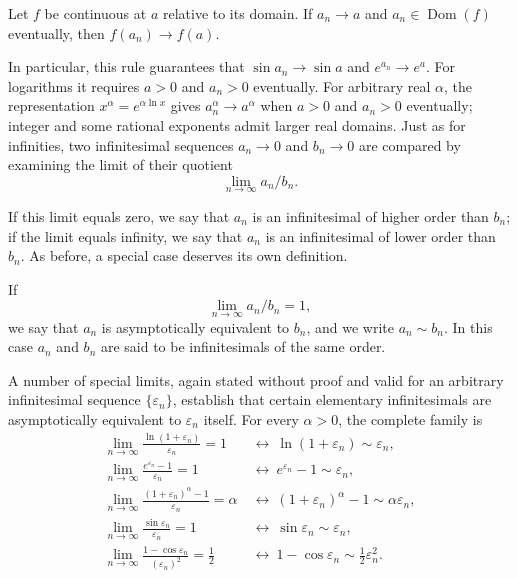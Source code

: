 \begin{theorem}
Let $f$ be continuous at $a$ relative to its domain. If $a_n\to a$ and
$a_n\in\operatorname{Dom}(f)$ eventually, then $f(a_n)\to f(a)$.
\end{theorem}

In particular, this rule guarantees that $\sin a_n \to \sin a$ and
$e^{a_n}\to e^a$. For logarithms it requires $a>0$ and $a_n>0$
eventually. For arbitrary real $\alpha$, the representation
$x^\alpha=e^{\alpha\ln x}$ gives $a_n^\alpha\to a^\alpha$ when $a>0$
and $a_n>0$ eventually; integer and some rational exponents admit larger
real domains. Just as for infinities, two
infinitesimal sequences $a_n \to 0$ and $b_n \to 0$ are compared by examining the limit of their quotient
\[
\lim_{n \to \infty} a_n / b_n.
\]

If this limit equals zero, we say that $a_n$ is an infinitesimal of higher order
than $b_n$; if the limit equals infinity, we say that $a_n$ is an infinitesimal of lower order than $b_n$.
As before, a special case deserves its own definition.

\begin{definition}
If \[
\lim_{n \to \infty} a_n / b_n = 1,
\] we say that $a_n$ is asymptotically equivalent to $b_n$, and we write
$a_n \sim b_n$. In this case $a_n$ and $b_n$ are said to be infinitesimals of the same order.
\end{definition}

A number of special limits, again stated without proof and valid for an
arbitrary infinitesimal sequence $\{\varepsilon_n\}$, establish that
certain elementary infinitesimals are asymptotically equivalent to
$\varepsilon_n$ itself. For every $\alpha>0$, the complete family is
\[
\begin{aligned}
\lim_{n \to \infty} \frac{\ln(1 + \varepsilon_n)}{\varepsilon_n} = 1
&\ \longleftrightarrow\ \ln(1 + \varepsilon_n) \sim \varepsilon_n, \\
\lim_{n \to \infty} \frac{e^{\varepsilon_n} - 1}{\varepsilon_n} = 1
&\ \longleftrightarrow\ e^{\varepsilon_n} - 1 \sim \varepsilon_n, \\
\lim_{n \to \infty}
\frac{(1 + \varepsilon_n)^\alpha - 1}{\varepsilon_n} = \alpha
&\ \longleftrightarrow\
(1 + \varepsilon_n)^\alpha - 1 \sim \alpha\varepsilon_n, \\
\lim_{n \to \infty} \frac{\sin \varepsilon_n}{\varepsilon_n} = 1
&\ \longleftrightarrow\ \sin \varepsilon_n \sim \varepsilon_n, \\
\lim_{n \to \infty} \frac{1 - \cos \varepsilon_n}{(\varepsilon_n)^2} = \frac{1}{2}
&\ \longleftrightarrow\
1 - \cos \varepsilon_n \sim \frac{1}{2}\varepsilon_n^2.
\end{aligned}
\]

